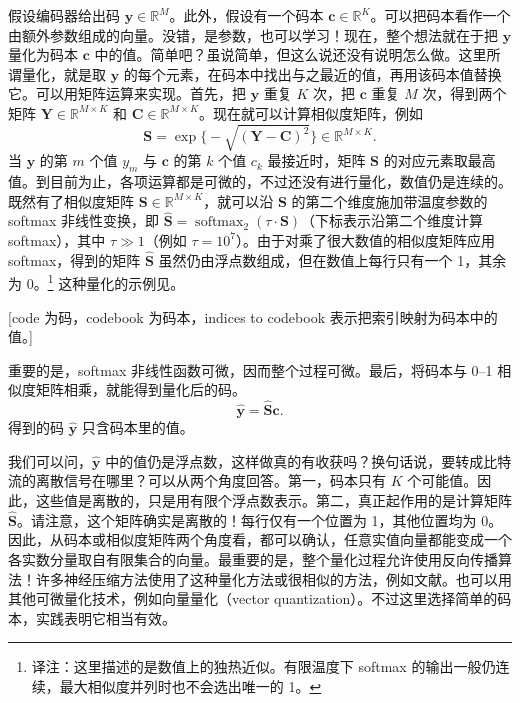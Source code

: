 假设编码器给出码 $\mathbf y\in\mathbb R^M$。此外，假设有一个码本 $\mathbf c\in\mathbb R^K$。可以把码本看作一个由额外参数组成的向量。没错，是参数，也可以学习！现在，整个想法就在于把 $\mathbf y$ 量化为码本 $\mathbf c$ 中的值。简单吧？虽说简单，但这么说还没有说明怎么做。这里所谓量化，就是取 $\mathbf y$ 的每个元素，在码本中找出与之最近的值，再用该码本值替换它。可以用矩阵运算来实现。首先，把 $\mathbf y$ 重复 $K$ 次，把 $\mathbf c$ 重复 $M$ 次，得到两个矩阵 $\mathbf Y\in\mathbb R^{M\times K}$ 和 $\mathbf C\in\mathbb R^{M\times K}$。现在就可以计算相似度矩阵，例如
\[
  \mathbf S=\exp\bigl\{-\sqrt{(\mathbf Y-\mathbf C)^2}\bigr\}\in\mathbb R^{M\times K}.
\]
当 $\mathbf y$ 的第 $m$ 个值 $y_m$ 与 $\mathbf c$ 的第 $k$ 个值 $c_k$ 最接近时，矩阵 $\mathbf S$ 的对应元素取最高值。到目前为止，各项运算都是可微的，不过还没有进行量化，数值仍是连续的。既然有了相似度矩阵 $\mathbf S\in\mathbb R^{M\times K}$，就可以沿 $\mathbf S$ 的第二个维度施加带温度参数的 softmax 非线性变换，即 $\hat{\mathbf S}=\operatorname{softmax}_2(\tau\cdot\mathbf S)$（下标表示沿第二个维度计算 softmax），其中 $\tau\gg1$（例如 $\tau=10^7$）。由于对乘了很大数值的相似度矩阵应用 softmax，得到的矩阵 $\hat{\mathbf S}$ 虽然仍由浮点数组成，但在数值上每行只有一个 1，其余为 0。\footnote{译注：这里描述的是数值上的独热近似。有限温度下 softmax 的输出一般仍连续，最大相似度并列时也不会选出唯一的 1。} 这种量化的示例见。

[code 为码，codebook 为码本，indices to codebook 表示把索引映射为码本中的值。]

重要的是，softmax 非线性函数可微，因而整个过程可微。最后，将码本与 0–1 相似度矩阵相乘，就能得到量化后的码。
\begin{equation}
  \hat{\mathbf y}=\hat{\mathbf S}\mathbf c.
  \tag{10.3}\label{eq:10-03}
\end{equation}
得到的码 $\hat{\mathbf y}$ 只含码本里的值。

我们可以问，$\hat{\mathbf y}$ 中的值仍是浮点数，这样做真的有收获吗？换句话说，要转成比特流的离散信号在哪里？可以从两个角度回答。第一，码本只有 $K$ 个可能值。因此，这些值是离散的，只是用有限个浮点数表示。第二，真正起作用的是计算矩阵 $\hat{\mathbf S}$。请注意，这个矩阵确实是离散的！每行仅有一个位置为 1，其他位置均为 0。因此，从码本或相似度矩阵两个角度看，都可以确认，任意实值向量都能变成一个各实数分量取自有限集合的向量。最重要的是，整个量化过程允许使用反向传播算法！许多神经压缩方法使用了这种量化方法或很相似的方法，例如文献。也可以用其他可微量化技术，例如向量量化（vector quantization）。不过这里选择简单的码本，实践表明它相当有效。

